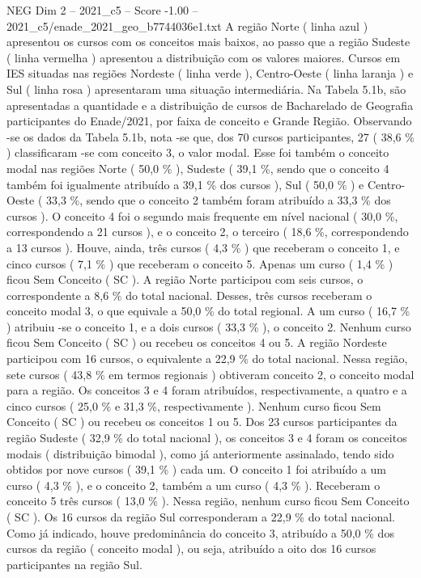 \begin{textsample}{NEG Dim 2 – 2021\_c5 – Score -1.00 – 2021\_c5/enade\_2021\_geo\_b7744036e1.txt}
A região Norte ( linha azul ) apresentou os cursos com os conceitos mais baixos, ao passo que a região Sudeste ( linha vermelha ) apresentou a distribuição com os valores maiores.
Cursos em IES situadas nas regiões Nordeste ( linha verde ), Centro-Oeste ( linha laranja ) e Sul ( linha rosa ) apresentaram uma situação intermediária.
Na Tabela 5.1b, são apresentadas a quantidade e a distribuição de cursos de Bacharelado de Geografia participantes do Enade/2021, por faixa de conceito e Grande Região.
Observando -se os dados da Tabela 5.1b, nota -se que, dos 70 cursos participantes, 27 ( 38,6 \% ) classificaram -se com conceito 3, o valor modal.
Esse foi também o conceito modal nas regiões Norte ( 50,0 \% ), Sudeste ( 39,1 \%, sendo que o conceito 4 também foi igualmente atribuído a 39,1 \% dos cursos ), Sul ( 50,0 \% ) e Centro-Oeste ( 33,3 \%, sendo que o conceito 2 também foram atribuído a 33,3 \% dos cursos ).
O conceito 4 foi o segundo mais frequente em nível nacional ( 30,0 \%, correspondendo a 21 cursos ), e o conceito 2, o terceiro ( 18,6 \%, correspondendo a 13 cursos ).
Houve, ainda, três cursos ( 4,3 \% ) que receberam o conceito 1, e cinco cursos ( 7,1 \% ) que receberam o conceito 5.
Apenas um curso ( 1,4 \% ) ficou Sem Conceito ( SC ).
A região Norte participou com seis cursos, o correspondente a 8,6 \% do total nacional.
Desses, três cursos receberam o conceito modal 3, o que equivale a 50,0 \% do total regional.
A um curso ( 16,7 \% ) atribuiu -se o conceito 1, e a dois cursos ( 33,3 \% ), o conceito 2.
Nenhum curso ficou Sem Conceito ( SC ) ou recebeu os conceitos 4 ou 5.
A região Nordeste participou com 16 cursos, o equivalente a 22,9 \% do total nacional.
Nessa região, sete cursos ( 43,8 \% em termos regionais ) obtiveram conceito 2, o conceito modal para a região.
Os conceitos 3 e 4 foram atribuídos, respectivamente, a quatro e a cinco cursos ( 25,0 \% e 31,3 \%, respectivamente ).
Nenhum curso ficou Sem Conceito ( SC ) ou recebeu os conceitos 1 ou 5.
Dos 23 cursos participantes da região Sudeste ( 32,9 \% do total nacional ), os conceitos 3 e 4 foram os conceitos modais ( distribuição bimodal ), como já anteriormente assinalado, tendo sido obtidos por nove cursos ( 39,1 \% ) cada um.
O conceito 1 foi atribuído a um curso ( 4,3 \% ), e o conceito 2, também a um curso ( 4,3 \% ).
Receberam o conceito 5 três cursos ( 13,0 \% ).
Nessa região, nenhum curso ficou Sem Conceito ( SC ).
Os 16 cursos da região Sul corresponderam a 22,9 \% do total nacional.
Como já indicado, houve predominância do conceito 3, atribuído a 50,0 \% dos cursos da região ( conceito modal ), ou seja, atribuído a oito dos 16 cursos participantes na região Sul.

\end{textsample}
